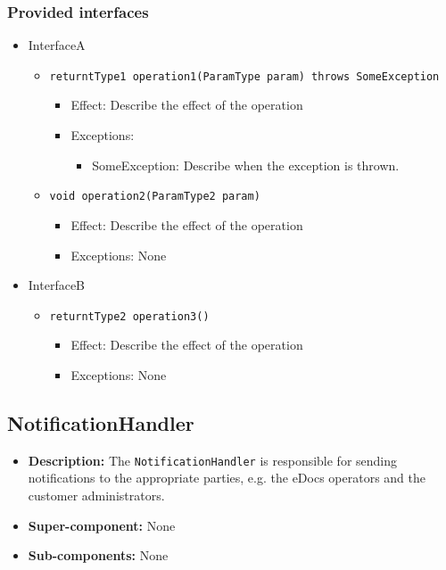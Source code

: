 \documentclass[a4paper,10pt]{article}
\begin{document}
\subsubsection*{Provided interfaces}
\begin{itemize}
    \item InterfaceA
    \begin{itemize}
        \item \texttt{returntType1 operation1(ParamType param) throws SomeException}
        \begin{itemize}
            \item Effect: Describe the effect of the operation
            \item Exceptions:
            \begin{itemize}
                \item SomeException: Describe when the exception is thrown.
            \end{itemize}
		\end{itemize}
		
        \item \texttt{void operation2(ParamType2 param)}
        \begin{itemize}
            \item Effect: Describe the effect of the operation
            \item Exceptions: None
        \end{itemize}
    \end{itemize}

    \item InterfaceB
    \begin{itemize}
        \item \texttt{returntType2 operation3()}
        \begin{itemize}
            \item Effect: Describe the effect of the operation
            \item Exceptions: None
        \end{itemize}
    \end{itemize}
\end{itemize}

\subsection{NotificationHandler}
\begin{itemize}
    \item \textbf{Description:} The \texttt{NotificationHandler} is responsible for sending notifications to the appropriate parties, e.g. the eDocs operators and the customer administrators.
    \item \textbf{Super-component:} None
    \item \textbf{Sub-components:} None
\end{itemize}
\end{document}
